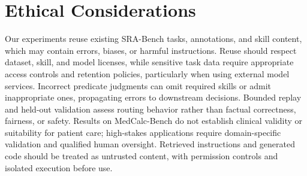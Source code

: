 \section*{Ethical Considerations}

Our experiments reuse existing SRA-Bench tasks, annotations, and skill content, which may contain errors, biases, or harmful instructions. Reuse should respect dataset, skill, and model licenses, while sensitive task data require appropriate access controls and retention policies, particularly when using external model services. Incorrect predicate judgments can omit required skills or admit inappropriate ones, propagating errors to downstream decisions. Bounded replay and held-out validation assess routing behavior rather than factual correctness, fairness, or safety. Results on MedCalc-Bench do not establish clinical validity or suitability for patient care; high-stakes applications require domain-specific validation and qualified human oversight. Retrieved instructions and generated code should be treated as untrusted content, with permission controls and isolated execution before use.
